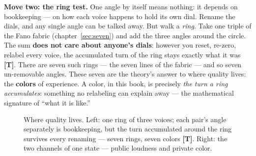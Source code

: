 \documentclass[11pt,letterpaper]{article}
\newcommand{\stT}{\textbf{[T]}\xspace}
\begin{document}
\textbf{Move two: the ring test.} One angle by itself means nothing:
it depends on bookkeeping --- on how each voice happens to hold its
own dial. Rename the dials, and any single angle can be talked away.
But walk a \emph{ring}. Take one triple of the Fano fabric
(chapter~\ref{sec:seven}) and add the three angles around the circle.
The sum \textbf{does not care about anyone's dials}: however you
reset, re-zero, relabel every voice, the accumulated turn of the ring
stays exactly what it was \stT. There are seven such rings --- the
seven lines of the fabric --- and so seven un-removable angles.
These seven are the theory's answer to where quality lives: the
\textbf{colors} of experience. A color, in this book, is precisely
\emph{the turn a ring accumulates}: something no relabeling can
explain away --- the mathematical signature of ``what it is like.''

\begin{figure}[H]
\centering
{}
\caption{Where quality lives. Left: one ring of three voices; each
pair's angle separately is bookkeeping, but the turn accumulated
around the ring survives every renaming --- seven rings, seven
colors \stT. Right: the two channels of one state --- public
loudness and private color.}
\label{fig:ring}
\end{figure}
\end{document}
